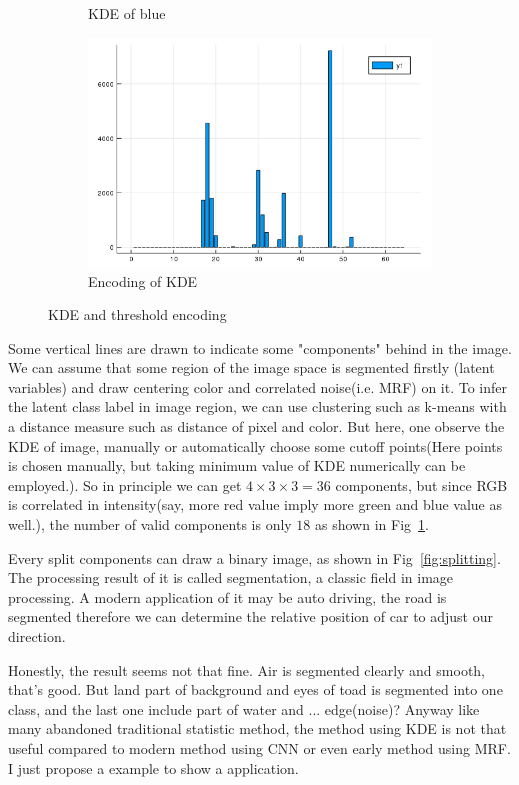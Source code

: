 \documentclass{article}
\begin{document}
\begin{figure}[htb]
\begin{subfigure}[b]{0.4\linewidth}
    \caption{KDE of blue}
  \end{subfigure}
  \begin{subfigure}[b]{0.4\linewidth}
    \includegraphics[width=\linewidth]{images/kde_code.png}
    \caption{Encoding of KDE}
  \end{subfigure}
  \caption{KDE and threshold encoding}
  \label{fig:kde}
\end{figure}

Some vertical lines are drawn to indicate some "components" behind in the image. 
We can assume that some region of the image space is segmented firstly (latent variables) 
and draw centering color and correlated noise(i.e. MRF) on it. 
To infer the latent class label in image region,
we can use clustering such as k-means with a distance measure such as distance of pixel and color. 
But here, one observe the KDE of image,
manually or automatically choose some cutoff points(Here points is chosen manually, 
but taking minimum value of KDE numerically can be employed.). 
So in principle we can get $4\times 3\times 3=36$ components, 
but since RGB is correlated in intensity(say, more red value imply more green and blue value as well.), 
the number of valid components is only $18$ as shown in Fig~\ref{fig:kde}.

Every split components can draw a binary image, as shown in Fig~\ref{fig:splitting}. 
The processing result of it is called segmentation, a classic field in image processing. 
A modern application of it may be auto driving, the road is segmented therefore we can determine the
relative position of car to adjust our direction.

Honestly, the result seems not that fine. Air is segmented clearly and smooth, that's good.
But land part of background and eyes of toad is segmented into one class, 
and the last one include part of water and ... edge(noise)? 
Anyway like many abandoned traditional statistic method, 
the method using KDE is not that useful compared to modern method using CNN \cite{long2015fully} or 
even early method using MRF\cite{panjwani1995markov}. I just propose a example to show a application.
\end{document}
